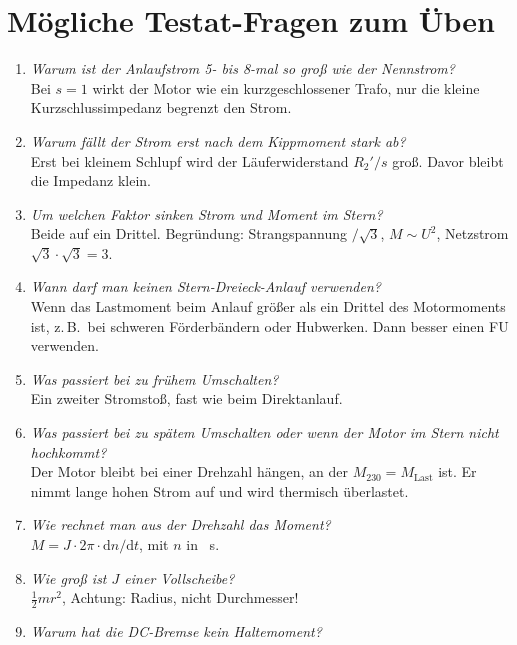 \documentclass[11pt,a4paper]{article}
\begin{document}
\section{Mögliche Testat-Fragen zum Üben}
\begin{enumerate}[label=\textbf{F\arabic*:},leftmargin=2.2em]
\item \emph{Warum ist der Anlaufstrom 5- bis 8-mal so groß wie der Nennstrom?}\\
  Bei $s=1$ wirkt der Motor wie ein kurzgeschlossener Trafo, nur die kleine
  Kurzschlussimpedanz begrenzt den Strom.
\item \emph{Warum fällt der Strom erst nach dem Kippmoment stark ab?}\\
  Erst bei kleinem Schlupf wird der Läuferwiderstand $R_2'/s$ groß. Davor bleibt die
  Impedanz klein.
\item \emph{Um welchen Faktor sinken Strom und Moment im Stern?}\\
  Beide auf ein Drittel. Begründung: Strangspannung $/\sqrt3$, $M\sim U^2$, Netzstrom
  $\sqrt3\cdot\sqrt3 = 3$.
\item \emph{Wann darf man keinen Stern-Dreieck-Anlauf verwenden?}\\
  Wenn das Lastmoment beim Anlauf größer als ein Drittel des Motormoments ist, z.\,B.\
  bei schweren Förderbändern oder Hubwerken. Dann besser einen FU verwenden.
\item \emph{Was passiert bei zu frühem Umschalten?}\\
  Ein zweiter Stromstoß, fast wie beim Direktanlauf.
\item \emph{Was passiert bei zu spätem Umschalten oder wenn der Motor im Stern nicht hochkommt?}\\
  Der Motor bleibt bei einer Drehzahl hängen, an der $M_{230} = M_\mathrm{Last}$ ist.
  Er nimmt lange hohen Strom auf und wird thermisch überlastet.
\item \emph{Wie rechnet man aus der Drehzahl das Moment?}\\
  $M = J\cdot 2\pi\cdot \mathrm dn/\mathrm dt$, mit $n$ in \si{\per\second}.
\item \emph{Wie groß ist $J$ einer Vollscheibe?}\\
  $\frac12 m r^2$, Achtung: Radius, nicht Durchmesser!
\item \emph{Warum hat die DC-Bremse kein Haltemoment?}\\

\end{enumerate}
\end{document}
